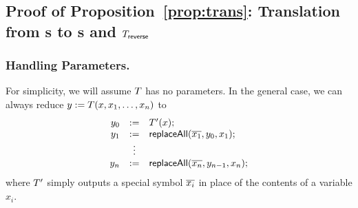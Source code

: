 {\subsection{Proof of Proposition~\ref{prop:trans}: Translation from \SPPT{}s to \PT{}s and $T_{\sf reverse}$}

%





\subsubsection{Handling Parameters.}
For simplicity, we will assume $T$ has no parameters.
%
In the general case, we can always reduce
$y := T(x, x_1, \ldots, x_n)$
to
\[
    \begin{array}{rcl}
        y_0 &:=& T'(x); \\
        y_1 &:=& \mathsf{replaceAll}(\overline{x_1}, y_0, x_1); \\
            &\vdots& \\
        y_n &:=& \mathsf{replaceAll}(\overline{x_n}, y_{n-1}, x_n);
    \end{array}
\]
where $T'$ simply outputs a special symbol $\overline{x_i}$ in place of
the contents of a variable $x_i$.

}
